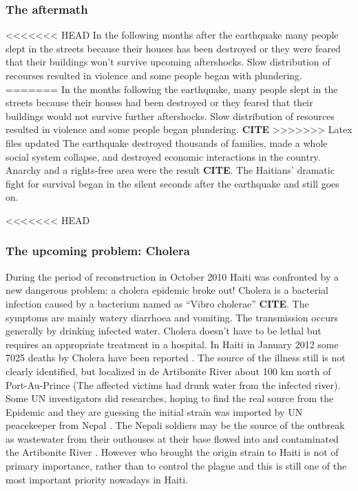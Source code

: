 \documentclass[11pt]{article}
\begin{document}
\subsubsection*{The aftermath}

<<<<<<< HEAD
In the following months after the earthquake many people slept in the streets because their houses has been destroyed or they were feared that their buildings won’t survive upcoming aftershocks. Slow distribution of recourses resulted in violence and some people began with plundering. 
=======
In the months following the earthquake, many people slept in the streets because their houses had been destroyed or they feared that their buildings would not survive further aftershocks. Slow distribution of resources resulted in violence and some people began plundering. \textbf{CITE}
>>>>>>> Latex files updated
\newline
The earthquake destroyed thousands of families, made a whole social system collapse, and destroyed economic interactions in the country. Anarchy and a rights-free area were the result \textbf{CITE}. The Haitians' dramatic fight for survival began in the silent seconds after the earthquake and still goes on.


<<<<<<< HEAD
\subsubsection*{The upcoming problem: Cholera}
During the period of reconstruction in October 2010 Haiti was confronted by a new dangerous problem: a cholera epidemic broke out! 
\newline
Cholera is a bacterial infection caused by a bacterium named as “Vibro cholerae” \textbf{CITE}. The symptoms are mainly watery diarrhoea and vomiting. The transmission occurs generally by drinking infected water. Cholera doesn’t have to be lethal but requires an appropriate treatment in a hospital. In Haiti in January 2012 some 7025 deaths by Cholera have been reported \cite{web:MSPP}.
The source of the illness still is not clearly identified, but localized in de Artibonite River about 100 km north of Port-Au-Prince (The affected victims had drunk water from the infected river). Some UN investigators did researches, hoping to find the real source from the Epidemic and they are guessing the initial strain was imported by UN peacekeeper from Nepal \cite{web:alj}. The Nepali soldiers may be the source of the outbreak as wastewater from their outhouses at their base flowed into and contaminated the Artibonite River  . However who brought the origin strain to Haiti is not of primary importance, rather than to control the plague and this is still one of the most important priority nowadays in Haiti.
\end{document}
